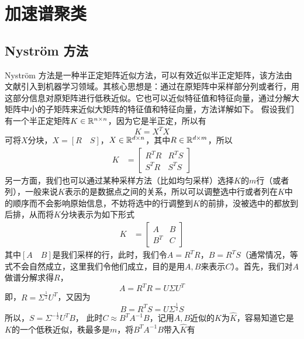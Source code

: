\section{加速谱聚类}
\subsection{Nyström 方法}
Nyström 方法是一种半正定矩阵近似方法，可以有效近似半正定矩阵，该方法由文献\cite{williams2001using}引入到机器学习领域。其核心思想是：通过在原矩阵中采样部分列或者行，用这部分信息对原矩阵进行低秩近似。它也可以近似特征值和特征向量，通过分解大矩阵中小的子矩阵来近似大矩阵的特征值和特征向量，方法详解如下。
假设我们有一个半正定矩阵$K \in \mathbb{R}^{n \times n}$，因为它是半正定，所以有
\begin{equation*}
    K = X^T X
\end{equation*}
可将$X$分块，$X=[R\quad S]$，$X \in \mathbb{R}^{d\times n}$，其中$R \in \mathbb{R}^{d\times m}$，所以
\begin{align*}
    K & = \begin{bmatrix}
            R^T R & R^T S \\
            S^T R & S^T S 
          \end{bmatrix} 
\end{align*}
另一方面，我们也可以通过某种采样方法（比如均匀采样）选择$K$的$m$行（或者列），一般来说$K$表示的是数据点之间的关系，所以可以调整选中行或者列在$K$中的顺序而不会影响原始信息，不妨将选中的行调整到$K$的前排，没被选中的都放到后排，从而将$K$分块表示为如下形式
\begin{align*}
    K & = \begin{bmatrix}
            A & B \\
            B^T & C
          \end{bmatrix} 
\end{align*}
其中$[A \quad B]$是我们采样的行，此时，我们令$A = R^T R$，$B = R^T S$（通常情况，等式不会自然成立，这里我们令他们成立，目的是用$A,B$来表示$C$）。首先，我们对$A$做谱分解求得$R$，
\begin{equation*}
    A = R^T R = U\Sigma U^T
\end{equation*}
即，$R = \Sigma^{\frac{1}{2}}U^T$，又因为
\begin{equation*}
    B = R^T S = U\Sigma^{\frac{1}{2}}S
\end{equation*}
所以，$S = \Sigma^{-\frac{1}{2}}U^T B$，
此时$C \approx B^T A^{-1} B$，记用$A,B$近似的$K$为$\hat{K}$，容易知道它是$K$的一个低秩近似，秩最多是$m$，将$B^T A^{-1} B$带入$\hat{K}$有
